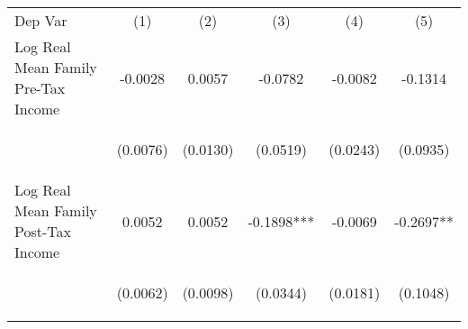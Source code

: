 \begin{center}
\begin{tabular}{lccccc}
\hline \noalign{\smallskip}Dep Var & (1) & (2) & (3) & (4) & (5)\\
\noalign{\smallskip}\hline \noalign{\smallskip}Log Real Mean Family Pre-Tax Income & \begin{scriptsize}-0.0028\end{scriptsize} & \begin{scriptsize}0.0057\end{scriptsize} & \begin{scriptsize}-0.0782\end{scriptsize} & \begin{scriptsize}-0.0082\end{scriptsize} & \begin{scriptsize}-0.1314\end{scriptsize}\\
 & \begin{scriptsize}(0.0076)\end{scriptsize} & \begin{scriptsize}(0.0130)\end{scriptsize} & \begin{scriptsize}(0.0519)\end{scriptsize} & \begin{scriptsize}(0.0243)\end{scriptsize} & \begin{scriptsize}(0.0935)\end{scriptsize}\\
\noalign{\smallskip}Log Real Mean Family Post-Tax Income & \begin{scriptsize}0.0052\end{scriptsize} & \begin{scriptsize}0.0052\end{scriptsize} & \begin{scriptsize}-0.1898***\end{scriptsize} & \begin{scriptsize}-0.0069\end{scriptsize} & \begin{scriptsize}-0.2697**\end{scriptsize}\\
 & \begin{scriptsize}(0.0062)\end{scriptsize} & \begin{scriptsize}(0.0098)\end{scriptsize} & \begin{scriptsize}(0.0344)\end{scriptsize} & \begin{scriptsize}(0.0181)\end{scriptsize} & \begin{scriptsize}(0.1048)\end{scriptsize}\\

\end{tabular}
\end{center}
